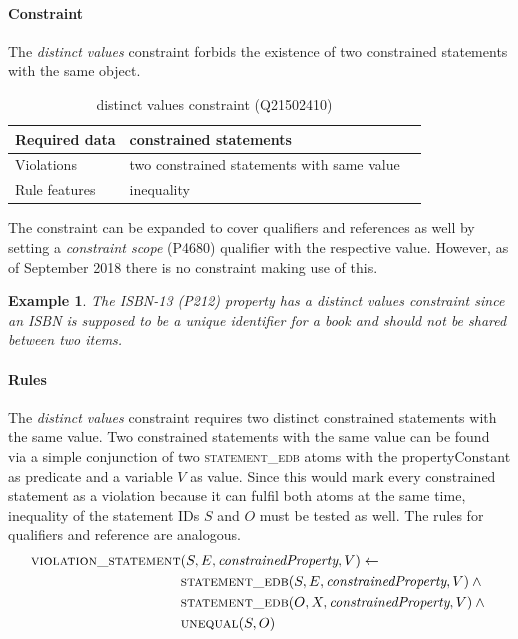 \documentclass[hyperref,bachelorofscience,fleqn]{cgvpub}
\newtheorem{example}{Example}
\begin{document}
\paragraph{Constraint}
The \emph{distinct values} constraint forbids the existence of two constrained statements with the same object.
\begin{table}[H]
\caption{distinct values constraint (Q21502410)}
\begin{tabularx}{\textwidth}{ ll X}
\hline
Required data & constrained statements \\
\hline
Violations & two constrained statements with same value \\
\hline
Rule features & inequality \\
\hline
\end{tabularx}
\end{table}
The constraint can be expanded to cover qualifiers and references as well by setting a \emph{constraint scope} (P4680) qualifier with the respective value. However, as of September 2018 there is no constraint making use of this.

\begin{example}
The \emph{ISBN-13} (P212) property has a \emph{distinct values} constraint since an ISBN is supposed to be a unique identifier for a book and should not be shared between two items.
\end{example}

\paragraph{Rules}
The \emph{distinct values} constraint requires two distinct constrained statements with the same value. 
Two constrained statements with the same value can be found via a simple conjunction of two \textsc{statement\_edb} atoms with the propertyConstant as predicate and a variable \(V\) as value. Since this would mark every constrained statement as a violation because it can fulfil both atoms at the same time, inequality of the statement IDs \(S\) and \(O\) must be tested as well. The rules for qualifiers and reference are analogous.
\begin{align}
\begin{split}
\textsc{violation\_statement}&(S, E, \emph{constrainedProperty}, V) \leftarrow \\
&\textsc{statement\_edb}(S, E, \emph{constrainedProperty}, V) \wedge{} \\
&\textsc{statement\_edb}(O, X, \emph{constrainedProperty}, V) \wedge{} \\
&\textsc{unequal}(S, O)
\end{split}
\end{align}
\end{document}
